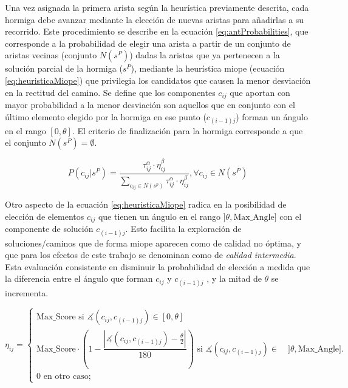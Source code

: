 Una vez asignada la primera arista seg\'un la heur\'istica previamente descrita, cada hormiga debe avanzar mediante la elecci\'on de nuevas aristas para a\~nadirlas a su recorrido. Este procedimiento se describe en la ecuaci\'on \eqref{eq:antProbabilities}, que corresponde a la probabilidad de elegir una arista a partir de un conjunto de aristas vecinas (conjunto $N(s^{P})$) dadas la aristas que ya pertenecen a la soluci\'on parcial de la hormiga ($s^P$), mediante la heur\'istica miope (ecuaci\'on \eqref{eq:heuristicaMiope}) que privilegia los candidatos que causen la menor desviaci\'on en la rectitud del camino. Se define que los componentes $c_{ij}$ que aportan con mayor probabilidad a la menor desviaci\'on son aquellos que en conjunto con el \'ultimo elemento elegido por la hormiga en ese punto ($c_{(i-1)j}$) forman un \'angulo en el rango $[0, \theta]$. El criterio de finalizaci\'on para la hormiga corresponde a que el conjunto $N(s^{P}) = \emptyset$.

\begin{equation}
P(c_{ij} | s^{P}) = \frac
        {\tau_{ij}^{\alpha} \cdot \eta_{ij}^{\beta}}
        {\sum\limits_{c_{ij}\in N(s^p)}{\tau_{ij}^{\alpha} \cdot \eta_{ij}^{\beta} } }, \forall c_{ij} \in N(s^{P})
\label{eq:antProbabilities}
\end{equation}

Otro aspecto de la ecuaci\'on \eqref{eq:heuristicaMiope} radica en la posibilidad de elecci\'on de elementos $c_{ij}$ que tienen un \'angulo en el rango $]\theta, \text{Max\_Angle}]$ con el componente de soluci\'on $c_{(i-1)j}$. Esto facilita la exploraci\'on de soluciones/caminos que de forma miope aparecen como de calidad no \'optima, y que para los efectos de este trabajo se denominan como de {\it calidad intermedia}. Esta evaluaci\'on consistente en disminuir la probabilidad de elecci\'on a medida que la diferencia entre el \'angulo que forman $c_{ij}$ y $c_{(i-1)j}$  , y la mitad de $\theta$ se incrementa.



\begin{equation}
    \eta_{ij} = 
        \begin{cases} 
        \text{Max\_Score si } \measuredangle(c_{ij}, c_{(i-1)j}) \in [0, \theta]\\[3ex]
        
        \text{Max\_Score} \cdot \left(1 - \dfrac{ \left| \measuredangle(c_{ij}, c_{(i-1)j}) - \frac{\theta}{2} \right|} {180} \right)  \text{ si } \measuredangle(c_{ij}, c_{(i-1)j}) \in \quad ]\theta, \text{Max\_Angle}].\\[3ex]
        
        \text{0 en otro caso;}
        \end{cases}
    \label{eq:heuristicaMiope}
\end{equation}

